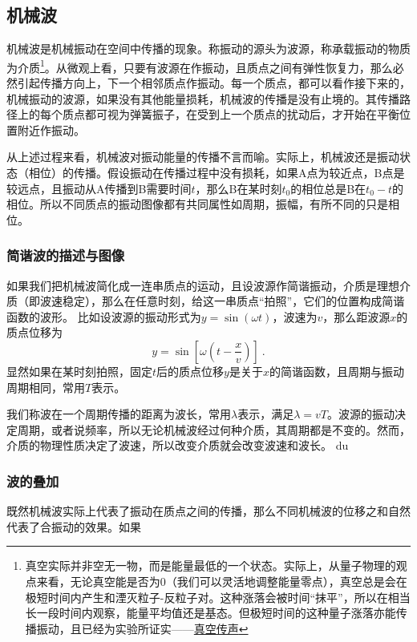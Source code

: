 
\subsection{机械波}
机械波是机械振动在空间中传播的现象。称振动的源头为波源，称承载振动的物质为介质\footnote{真空实际并非空无一物，而是能量最低的一个状态。实际上，从量子物理的观点来看，无论真空能是否为0（我们可以灵活地调整能量零点），真空总是会在极短时间内产生和湮灭粒子-反粒子对。这种涨落会被时间“抹平”，所以在相当长一段时间内观察，能量平均值还是基态。但极短时间的这种量子涨落亦能传播振动，且已经为实验所证实——\href{https://www.rmzxw.com.cn/c/2023-08-25/3399291.shtml}{真空传声}}。从微观上看，只要有波源在作振动，且质点之间有弹性恢复力，那么必然引起传播方向上，下一个相邻质点作振动。每一个质点，都可以看作接下来的，机械振动的波源，如果没有其他能量损耗，机械波的传播是没有止境的。其传播路径上的每个质点都可视为弹簧振子，在受到上一个质点的扰动后，才开始在平衡位置附近作振动。

从上述过程来看，机械波对振动能量的传播不言而喻。实际上，机械波还是振动状态（相位）的传播。假设振动在传播过程中没有损耗，如果A点为较近点，B点是较远点，且振动从A传播到B需要时间$t$，那么B在某时刻$t_0$的相位总是B在$t_0-t$的相位。所以不同质点的振动图像都有共同属性如周期，振幅，有所不同的只是相位。
\subsubsection{简谐波的描述与图像}
如果我们把机械波简化成一连串质点的运动，且设波源作简谐振动，介质是理想介质（即波速稳定），那么在任意时刻，给这一串质点“拍照”，它们的位置构成简谐函数的波形。
比如设波源的振动形式为$y=\sin(\omega t)$，波速为$v$，那么距波源$x$的质点位移为
\begin{equation}
y=\sin [\omega (t-\frac{x}{v})]~.
\end{equation}
显然如果在某时刻拍照，固定$t$后的质点位移$y$是关于$x$的简谐函数，且周期与振动周期相同，常用$T$表示。%

我们称波在一个周期传播的距离为波长，常用$\lambda $表示，满足$\lambda=vT$。波源的振动决定周期，或者说频率，所以无论机械波经过何种介质，其周期都是不变的。然而，介质的物理性质决定了波速，所以改变介质就会改变波速和波长。
du
\subsubsection{波的叠加}
既然机械波实际上代表了振动在质点之间的传播，那么不同机械波的位移之和自然代表了合振动的效果。如果
